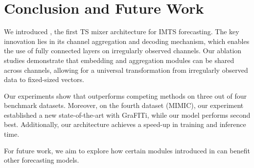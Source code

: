 \section{Conclusion and Future Work}
We introduced \model{}, the first TS mixer architecture for IMTS forecasting.
The key innovation lies in its channel aggregation and decoding mechanism, which enables the use of fully connected layers on irregularly observed channels. 
Our ablation studies demonstrate that embedding and aggregation modules can be shared across channels, allowing for a universal transformation from irregularly observed data to fixed-sized vectors.

Our experiments show that \model{} outperforms competing methods on three out of four benchmark datasets. 
Moreover, on the fourth dataset (MIMIC), our experiment established a new state-of-the-art with GraFITi, while our model performs second best.
Additionally, our architecture achieves a speed-up in training and inference time.

For future work, we aim to explore how certain modules introduced in \model{} can benefit other forecasting models.